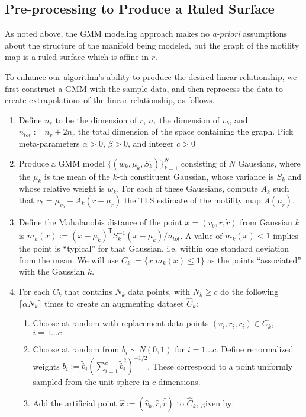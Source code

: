\documentclass[conference]{IEEEtran}
\newcommand{\T}{\mathsf{T}}
\begin{document}
\subsection{Pre-processing to Produce a Ruled Surface}

As noted above, the GMM modeling approach makes no \textit{a-priori} assumptions about the structure of the manifold being modeled, but the graph of the motility map is a ruled surface which is affine in $\dot r$.

To enhance our algorithm's ability to produce the desired linear relationship, we first construct a GMM with the sample data, and then reprocess the data to create extrapolations of the linear relationship, as follows.
\begin{enumerate}
	\item Define $n_r$ to be the dimension of $r$, $n_v$ the dimension of $v_b$, and $n_{tot} := n_v + 2 n_r$ the total dimension of the space containing the graph. 
	Pick meta-parameters $\alpha>0$, $\beta>0$, and integer $c>0$
	\item Produce a GMM model $\{(w_k, \mu_k, S_k)\}_{k=1}^N$ consisting of $N$ Gaussians, where the $\mu_k$ is the mean of the $k$-th constituent Gaussian, whose variance is $S_k$ and whose relative weight is $w_k$. 
	For each of these Gaussians, compute $A_k$ such that $v_b = {\mu_{v_b}} + A_k (\dot r - \mu_{\dot r})$ the TLS estimate of the motility map $A(\mu_r)$.
	\item Define the Mahalanobis distance of the point $x = (v_b,r,\dot r)$ from Gaussian $k$ is $m_k(x) := (x-\mu_k)^\T S_k^{-1} (x-\mu_k) / n_{tot}$.
	A value of $m_k(x)<1$ implies the point is ``typical'' for that Gaussian, i.e. within one standard deviation from the mean.
	We will use $C_k := \{ x | m_k(x) \leq 1 \}$ as the points ``associated'' with the Gaussian $k$. 
	\item For each $C_k$ that contains $N_k$ data points, with $N_k \geq c $ do the following $\lceil \alpha N_k \rceil$ times to create an augmenting dataset ${\hat C}_k$:
	\begin{enumerate}
		\item Choose at random with replacement data points $(v_i,r_i,{\dot r}_i) \in C_k$, $i = 1\ldots c$
		\item Choose at random from ${\tilde b}_i \sim N(0,1)$ for $i = 1\ldots c$.
		  Define renormalized weights $b_i := {\tilde b}_i \left( \sum_{i=1}^c {\tilde b}^2_i \right)^{-1/2}$.
		  These correspond to a point uniformly sampled from the unit sphere in $c$ dimensions.
		\item Add the artificial point $\hat x := ({\hat v}_b,{\hat r},{\hat {\dot r}})$ to ${\hat C}_k$, given by:

\end{enumerate}
\end{enumerate}
\end{document}
